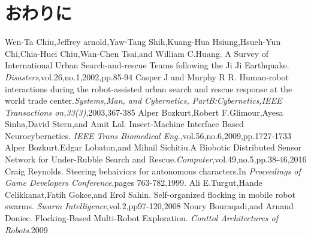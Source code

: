 \documentclass[a4paper,11pt]{jarticle}
\begin{document}
	\section{おわりに}
	\label{sec:last}
	\begin{thebibliography}{99}
		 Wen-Ta Chiu,Jeffrey arnold,Yaw-Tang Shih,Kuang-Hua Hsiung,Hsueh-Yun Chi,Chia-Huei Chiu,Wan-Chen Tsai,and William C.Huang. A Survey of International Urban Search-and-rescue Teams following the Ji Ji Earthquake. \textit{Disasters},vol.26,no.1,2002,pp.85-94
		Casper J and Murphy R R. Human-robot interactions during the robot-assisted urban search and rescue response at the world trade center.\textit{Systems,Man, and Cybernetics, PartB:Cybernetics,IEEE Transactions on,33(3)},2003,367-385
		Alper Bozkurt,Robert F.Glimour,Ayesa Sinha,David Stern,and Amit Lal. Insect-Machine Interface Based Neurocybernetics. \textit{IEEE Trans Biomedical Eng.},vol.56,no.6,2009,pp.1727-1733
		Alper Bozkurt,Edgar Lobaton,and Mihail Sichitiu.A Biobotic Distributed Sensor Network for Under-Rubble Search and Rescue.\textit{Computer},vol.49,no.5,pp.38-46,2016
		Craig Reynolds. Steering behaiviors for autonomous characters.In \textit{Proceedings of Game Developers Conference},pages 763-782,1999.
		Ali E.Turgut,Hande Celikkanat,Fatih Gokce,and Erol Sahin. Self-organized flocking in mobile robot swarms. \textit{Swarm Intelligence},vol.2,pp97-120,2008
		Noury Bouraqadi,and Arnaud Doniec. Flocking-Based Multi-Robot Exploration. \textit{Conttol Architectures of Robots}.2009
		
		
	\end{thebibliography}
\end{document}
